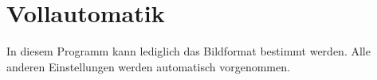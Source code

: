 \section{Vollautomatik}
\label{sec:full_automatic}
In diesem Programm kann lediglich das Bildformat bestimmt werden. Alle anderen Einstellungen werden automatisch vorgenommen.